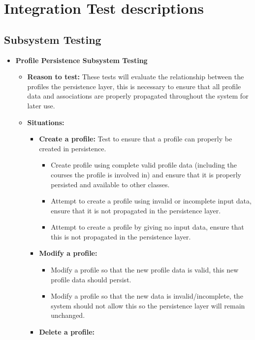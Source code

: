 \documentclass[12pt]{report}
\begin{document}
\section{Integration Test descriptions}
\subsection{Subsystem Testing}
\begin{itemize}
    \item \textbf{Profile Persistence Subsystem Testing}
         \begin{itemize}
             \item \textbf{Reason to test:} These tests will evaluate the relationship between the profiles the persistence layer, this is necessary to ensure that all profile data and associations are properly propagated throughout the system for later use.
             \item \textbf{Situations:}
             \begin{itemize}
                 \item \textbf{Create a profile:} Test to ensure that a profile can properly be created in persistence.
                 \begin{itemize}
                     \item Create profile using complete valid profile data (including the courses the profile is involved in) and ensure that it is properly persisted and available to other classes.
                     \item Attempt to create a profile using invalid or incomplete input data, ensure that it is not propagated in the persistence layer.
                     \item Attempt to create a profile by giving no input data, ensure that this is not propagated in the persistence layer.
                 \end{itemize}
                 \item \textbf{Modify a profile:}
                 \begin{itemize}
                     \item Modify a profile so that the new profile data is valid, this new profile data should persist.
                     \item Modify a profile so that the new data is invalid/incomplete, the system should not allow this so the persistence layer will remain unchanged.
                 \end{itemize}
                 \item \textbf{Delete a profile:}

\end{itemize}
\end{itemize}
\end{itemize}
\end{document}
